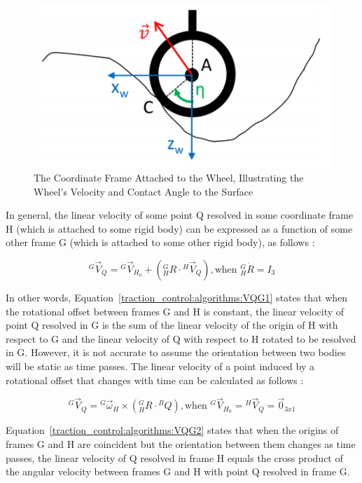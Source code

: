 \begin{figure}[htbp]
	\centering
	\includegraphics[width=.6\textwidth]{sections/algorithms/images/wheel_frame.png}
	\caption{The Coordinate Frame Attached to the Wheel, Illustrating the Wheel's Velocity and Contact Angle to the Surface \cite{tractl}}
	\label{traction_control:algorithms:wheel-frame}
\end{figure}

In general, the linear velocity of some point Q resolved in some coordinate frame H (which is attached to some rigid body) can be expressed as a function of some other frame G (which is attached to some other rigid body), as follows \cite{craig}:

\begin{equation}\label{traction_control:algorithms:VQG1}
	{}^{G}\vec{V}_{Q} = {}^{G}\vec{V}_{H_{0}} + ({}^{G}_{H}R \cdot {}^{H}\vec{V}_{Q}), \text{when } {}^{G}_{H}\dot{R} = I_{3}
\end{equation}

In other words, Equation~\ref{traction_control:algorithms:VQG1} states that when the rotational offset between frames G and H is constant, the linear velocity of point Q resolved in G is the sum of the linear velocity of the origin of H with respect to G and the linear velocity of Q with respect to H rotated to be resolved in G. However, it is not accurate to assume the orientation between two bodies will be static as time passes. The linear velocity of a point induced by a rotational offset that changes with time can be calculated as follows \cite{craig}:

\begin{equation}\label{traction_control:algorithms:VQG2}
	{}^{G}\vec{V}_{Q} = {}^{G}\vec{\omega}_{H} \times ({}^{G}_{H}R \cdot {}^{B}{Q}), \text{when } {}^{G}\vec{V}_{H_{0}} = {}^{H}\vec{V}_{Q} = \vec{0}_{3x1}
\end{equation}

Equation~\ref{traction_control:algorithms:VQG2} states that when the origins of frames G and H are coincident but the orientation between them changes as time passes, the linear velocity of Q resolved in frame H equals the cross product of the angular velocity between frames G and H with point Q resolved in frame G. \\


